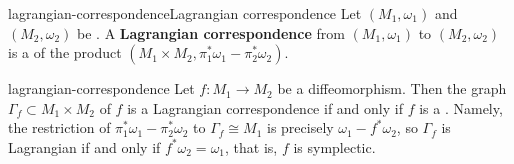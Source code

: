 \begin{topic}{lagrangian-correspondence}{Lagrangian correspondence}
    Let $(M_1, \omega_1)$ and $(M_2, \omega_2)$ be . A \textbf{Lagrangian correspondence} from $(M_1, \omega_1)$ to $(M_2, \omega_2)$ is a  of the product $(M_1 \times M_2, \pi_1^* \omega_1 - \pi_2^* \omega_2)$.
\end{topic}

\begin{example}{lagrangian-correspondence}
    Let $f \colon M_1 \to M_2$ be a diffeomorphism. Then the graph $\Gamma_f \subset M_1 \times M_2$ of $f$ is a Lagrangian correspondence if and only if $f$ is a . Namely, the restriction of $\pi_1^* \omega_1 - \pi_2^* \omega_2$ to $\Gamma_f \cong M_1$ is precisely $\omega_1 - f^* \omega_2$, so $\Gamma_f$ is Lagrangian if and only if $f^* \omega_2 = \omega_1$, that is, $f$ is symplectic.
\end{example}

